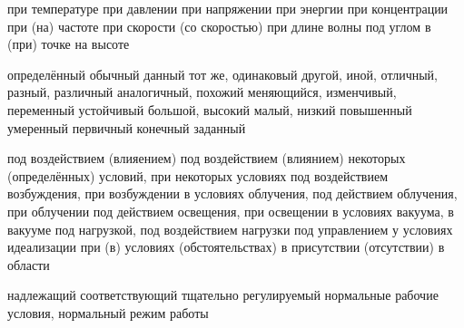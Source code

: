 
	{при температуре}
	{при давлении}
	{при напряжении}
	{при энергии}
	{при концентрации}
	{при (на) частоте}
	{при скорости (со скоростью)}
	{при длине волны}
	{под углом}
	{в (при) точке}
	{на высоте}

	{определённый}
	{обычный}
	{данный}
	{тот же, одинаковый}
	{другой, иной, отличный, разный, различный}
	{аналогичный, похожий}
	{меняющийся, изменчивый, переменный}
	{устойчивый}
	{большой, высокий}
	{малый, низкий}
	{повышенный}
	{умеренный}
	{первичный}
	{конечный}
	{заданный}

	{под воздействием (влияением)}
	{под воздействием (влиянием) некоторых (определённых) условий, при некоторых условиях}
	{под воздействием возбуждения, при возбуждении}
	{в условиях облучения, под действием облучения, при облучении}
	{под действием освещения, при освещении}
	{в условиях вакуума, в вакууме}
	{под нагрузкой, под воздействием нагрузки}
	{под управлением}
	{у условиях идеализации}
	{при (в) условиях (обстоятельствах)}
	{в присутствии (отсутствии)}
	{в области}

	{надлежащий}
	{соответствующий}
	{тщательно регулируемый}
	{нормальные рабочие условия, нормальный режим работы}

